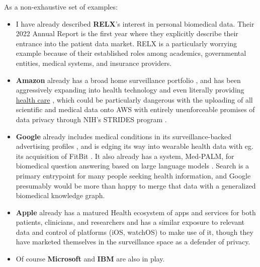 \documentclass{article}
\begin{document}
As a non-exhaustive set of examples:

\begin{itemize}

\item
  I have already described \textbf{RELX}'s interest in personal
  biomedical data. Their 2022 Annual Report \cite{relxAnnualReport20222023}  is the first year where they explicitly
  describe their entrance into the patient data market. RELX is a particularly worrying example because of
  their established roles among academics, governmental entities,
  medical systems, and insurance providers.
\item
  \textbf{Amazon} already has a broad home surveillance portfolio \cite{bridgesAmazonRingLargest2021} , and has been aggressively
  expanding into health technology \cite{AWSAnnouncesAWS2021} 
  and even literally providing \href{https://amazon.care/}{health care}
  \cite{fingasAmazonOfficiallyBecomes2023, lermanAmazonBuiltIts2021} , which could be particularly dangerous with the uploading of all
  scientific and medical data onto AWS with entirely unenforceable
  promises of data privacy through NIH's STRIDES program \cite{quinnYouCanTrust2021} .
\item
  \textbf{Google} already includes medical conditions in its
  surveillance-backed advertising profiles \cite{krashinskyGoogleBrokeCanada2014, bharatGeneratingUserInformation2005} , and is edging its way into wearable health data with eg. its
  acquisition of FitBit \cite{bourreauGoogleFitbitWill2020} . It
  also already has a system, Med-PALM, for biomedical question answering
  based on large language models \cite{piferGooglePlansBoost2023, matiasOurLatestHealth2023, singhalLargeLanguageModels2022} . Search
  is a primary entrypoint for many people seeking health information,
  and Google presumably would be more than happy to merge that data with
  a generalized biomedical knowledge graph.
\item
  \textbf{Apple} already has a matured Health ecosystem of apps and
  services for both patients, clinicians, and researchers \cite{appleEmpoweringPeopleLive2022, appleHealthcare}  and has a similar
  exposure to relevant data and control of platforms (iOS, watchOS) to
  make use of it, though they have marketed themselves in the
  surveillance space as a defender of privacy.
\item
  Of course \textbf{Microsoft} \cite{sinhaOverviewMicrosoftAcademic2015}  and \textbf{IBM} \cite{chenIBMWatsonHow2016}  are also in play.
\end{itemize}
\end{document}
